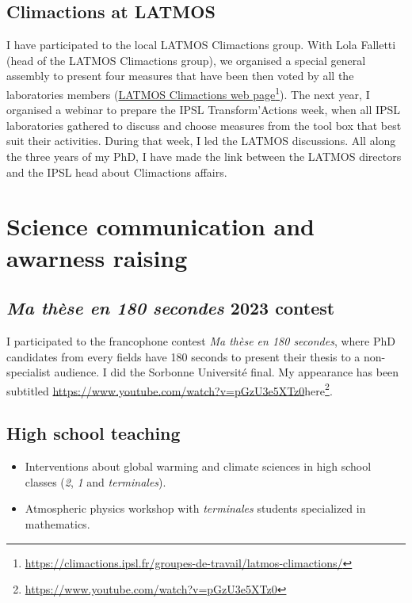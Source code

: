     \subsection*{Climactions at LATMOS}
    I have participated to the local LATMOS Climactions group. With Lola Falletti (head of the LATMOS Climactions group), we organised a special general assembly to present four measures that have been then voted by all the laboratories members (\href{https://climactions.ipsl.fr/groupes-de-travail/latmos-climactions/}{LATMOS Climactions web page}\footnote{\url{https://climactions.ipsl.fr/groupes-de-travail/latmos-climactions/}}).
    The next year, I organised a webinar to prepare the IPSL Transform'Actions week, when all IPSL laboratories gathered to discuss and choose measures from the tool box that best suit their activities.
    During that week, I led the LATMOS discussions.
    All along the three years of my PhD, I have made the link between the LATMOS directors and the IPSL head about Climactions affairs.


\section*{Science communication and awarness raising}
    \subsection*{\textit{Ma thèse en 180 secondes} 2023 contest}
    I participated to the francophone contest \textit{Ma thèse en 180 secondes}, where PhD candidates from every fields have 180 seconds to present their thesis to a non-specialist audience. I did the Sorbonne Université final. My appearance has been subtitled \url{https://www.youtube.com/watch?v=pGzU3e5XTz0}{here}\footnote{\url{https://www.youtube.com/watch?v=pGzU3e5XTz0}}.

    \subsection*{High school teaching}
        \begin{itemize}
            \item Interventions about global warming and climate sciences in high school classes (\textit{2}, \textit{1} and \textit{terminales}).
            \item Atmospheric physics workshop with \textit{terminales} students specialized in mathematics. 
        \end{itemize}


